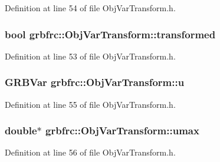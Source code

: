 Definition at line 54 of file Obj\+Var\+Transform.\+h.

\subsubsection[{\texorpdfstring{transformed}{transformed}}]{\setlength{\rightskip}{0pt plus 5cm}bool grbfrc\+::\+Obj\+Var\+Transform\+::transformed\hspace{0.3cm}{\ttfamily [private]}}\hypertarget{classgrbfrc_1_1ObjVarTransform_aa6f061234636a40a30c039119aeb58e3}{}\label{classgrbfrc_1_1ObjVarTransform_aa6f061234636a40a30c039119aeb58e3}


Definition at line 53 of file Obj\+Var\+Transform.\+h.

\subsubsection[{\texorpdfstring{u}{u}}]{\setlength{\rightskip}{0pt plus 5cm}G\+R\+B\+Var grbfrc\+::\+Obj\+Var\+Transform\+::u\hspace{0.3cm}{\ttfamily [private]}}\hypertarget{classgrbfrc_1_1ObjVarTransform_a611963103bbe1da24e2a505dcb766b34}{}\label{classgrbfrc_1_1ObjVarTransform_a611963103bbe1da24e2a505dcb766b34}


Definition at line 55 of file Obj\+Var\+Transform.\+h.

\subsubsection[{\texorpdfstring{umax}{umax}}]{\setlength{\rightskip}{0pt plus 5cm}double$\ast$ grbfrc\+::\+Obj\+Var\+Transform\+::umax\hspace{0.3cm}{\ttfamily [private]}}\hypertarget{classgrbfrc_1_1ObjVarTransform_a1295b4a0d4772f72e7acb3a7cf03184c}{}\label{classgrbfrc_1_1ObjVarTransform_a1295b4a0d4772f72e7acb3a7cf03184c}


Definition at line 56 of file Obj\+Var\+Transform.\+h.

